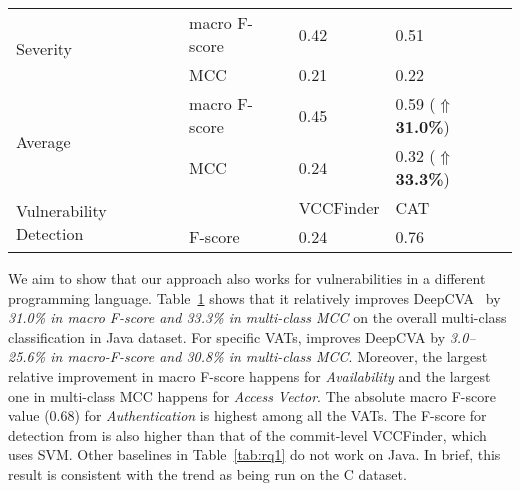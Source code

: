 \begin{table}[t]
\begin{center}
\begin{tabular}{l|p{2.0cm}<{\centering}|p{1.6cm}<{\centering}|p{1.5cm}<{\centering}}
			\hline
			\multirow{2}{*}{Severity}        & macro F-score                             &   0.42         & 0.51\\
			\cline{2-4}
			& MCC                                 &   0.21         & 0.22\\
			\hline
			\hline
			\multirow{2}{*}{Average}         & macro F-score                             &    0.45        & 0.59 ($\Uparrow${\bf 31.0\%})\\
			\cline{2-4}
			& MCC                                 & 0.24           & 0.32 ($\Uparrow${\bf 33.3\%})\\
			\hline
                        \hline
\multirow{2}{*}{Vulnerability Detection} &  & VCCFinder & CAT \\
\cline{2-4}
 & F-score & 0.24 & 0.76 \\
\hline
		\end{tabular}
		\label{rq2_results}
	\end{center}
\end{table}

We aim to show that our approach also works for vulnerabilities in a
different programming language. Table~\ref{rq2_results} shows that it relatively
improves DeepCVA~\cite{deepCVA-ase21} by {\em 31.0\% in macro F-score
and 33.3\% in multi-class MCC} on the overall multi-class
classification in Java dataset. For specific VATs, {\tool} improves
DeepCVA by {\em 3.0--25.6\% in macro-F-score and 30.8\% in
multi-class MCC}. Moreover, the largest relative improvement in macro
F-score happens for {\em Availability} and the largest one in
multi-class MCC happens for {\em Access Vector}.
The absolute macro F-score value (0.68) for {\em Authentication} is
highest among all the VATs.
%
The F-score for detection from {\tool} is also higher than that of the
commit-level VCCFinder, which uses SVM. Other baselines in
Table~\ref{tab:rq1} do not work on Java. In brief, this result is
consistent with the trend as {\tool} being run on the C dataset.



